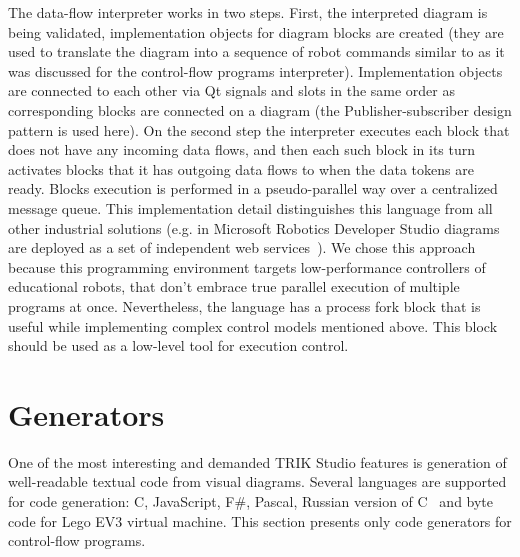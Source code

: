 \documentclass[conference]{IEEEtran}
\begin{document}
The data-flow interpreter works in two steps. First, the interpreted diagram is being validated, implementation objects for diagram blocks are created (they are used to translate the diagram into a sequence of robot commands similar to as it was discussed for the control-flow programs interpreter). Implementation objects are connected to each other via Qt signals and slots in the same order as corresponding blocks are connected on a diagram (the Publisher-subscriber design pattern is used here). On the second step the interpreter executes each block that does not have any incoming data flows, and then each such block in its turn activates blocks that it has outgoing data flows to when the data tokens are ready. Blocks execution is performed in a pseudo-parallel way over a centralized message queue. This implementation detail distinguishes this language from all other industrial solutions (e.g. in Microsoft Robotics Developer Studio diagrams are deployed as a set of independent web services~\cite{jackson2007microsoft}). We chose this approach because this programming environment targets low-performance controllers of educational robots, that don't embrace true parallel execution of multiple programs at once. Nevertheless, the language has a process fork block that is useful while implementing complex control models mentioned above. This block should be used as a low-level tool for execution control.

\section{Generators}
\label{chapter:generators}

One of the most interesting and demanded TRIK Studio features is generation of well-readable textual code from visual diagrams. Several languages are supported for code generation: C, JavaScript, F\#, Pascal, Russian version of C~\cite{тереховотечественные} and byte code for Lego EV3 virtual machine. This section presents only code generators for control-flow programs.
\end{document}
